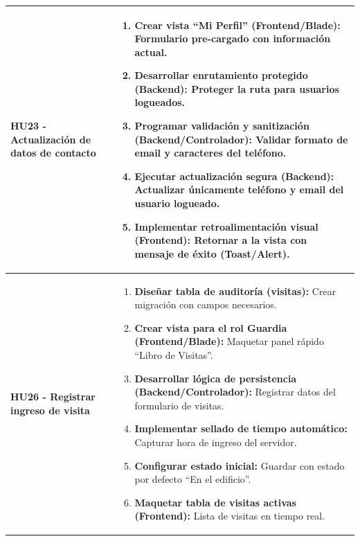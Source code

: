 \begin{longtable}{|p{4.5cm}|p{10.5cm}|}
        \textbf{HU23 - Actualización de datos de contacto} 
        
        & 

            \begin{enumerate}[leftmargin=*,nosep]
                \item \textbf{Crear vista ``Mi Perfil'' (Frontend/Blade):} Formulario pre-cargado con información actual.
                \item \textbf{Desarrollar enrutamiento protegido (Backend):} Proteger la ruta para usuarios logueados.
                \item \textbf{Programar validación y sanitización (Backend/Controlador):} Validar formato de email y caracteres del teléfono.
                \item \textbf{Ejecutar actualización segura (Backend):} Actualizar únicamente teléfono y email del usuario logueado.
                \item \textbf{Implementar retroalimentación visual (Frontend):} Retornar a la vista con mensaje de éxito (Toast/Alert).
            \end{enumerate} 
        
    \\ \hline

        \textbf{HU26 - Registrar ingreso de visita} 
        
        & 

            \begin{enumerate}[leftmargin=*,nosep]
                \item \textbf{Diseñar tabla de auditoría (visitas):} Crear migración con campos necesarios.
                \item \textbf{Crear vista para el rol Guardia (Frontend/Blade):} Maquetar panel rápido ``Libro de Visitas''.
                \item \textbf{Desarrollar lógica de persistencia (Backend/Controlador):} Registrar datos del formulario de visitas.
                \item \textbf{Implementar sellado de tiempo automático:} Capturar hora de ingreso del servidor.
                \item \textbf{Configurar estado inicial:} Guardar con estado por defecto ``En el edificio''.
                \item \textbf{Maquetar tabla de visitas activas (Frontend):} Lista de visitas en tiempo real.
            \end{enumerate} 
        

\end{longtable}
